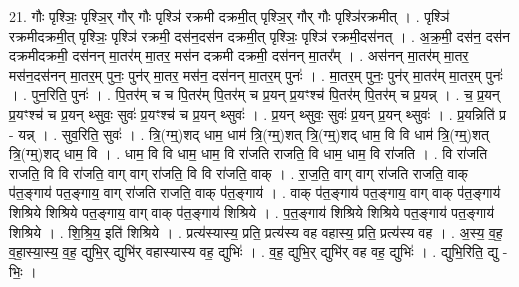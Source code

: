 \documentclass[17pt]{extarticle}
\begin{document}
21. गौः पृश्ञिः॒ पृश्ञि॒र् गौर् गौः पृश्ञि॑ रक्रमी दक्रमी॒त् पृश्ञि॒र् गौर् गौः पृश्ञि॑रक्रमीत् । . पृश्ञि॑ रक्रमीदक्रमी॒त् पृश्ञिः॒ पृश्ञि॑ रक्रमी॒ दस॑न॒दस॑न दक्रमी॒त् पृश्ञिः॒ पृश्ञि॑ रक्रमी॒दस॑नत् । . अ॒क्र॒मी॒ दस॑न॒ दस॑न दक्रमीदक्रमी॒ दस॑नन् मा॒तर॑म् मा॒तर॒ मस॑न दक्रमी दक्रमी॒ दस॑नन् मा॒तर᳚म् । . अस॑नन् मा॒तर॑म् मा॒तर॒ मस॑न॒दस॑नन् मा॒तर॒म् पुनः॒ पुन॑र् मा॒तर॒ मस॑न॒ दस॑नन् मा॒तर॒म् पुनः॑ । . मा॒तर॒म् पुनः॒ पुन॑र् मा॒तर॑म् मा॒तर॒म् पुनः॑ । . पुन॒रिति॒ पुनः॑ । . पि॒तर॑म् च च पि॒तर॑म् पि॒तर॑म् च प्र॒यन् प्र॒यꣳश्च॑ पि॒तर॑म् पि॒तर॑म् च प्र॒यन्न् । . च॒ प्र॒यन् प्र॒यꣳश्च॑ च प्र॒यन् थ्सुवः॒ सुवः॑ प्र॒यꣳश्च॑ च प्र॒यन् थ्सुवः॑ । . प्र॒यन् थ्सुवः॒ सुवः॑ प्र॒यन् प्र॒यन् थ्सुवः॑ । . प्र॒यन्निति॑ प्र - यन्न् । . सुव॒रिति॒ सुवः॑ । . त्रि॒(ग्म्॒)शद् धाम॒ धाम॑ त्रि॒(ग्म्॒)शत् त्रि॒(ग्म्॒)शद् धाम॒ वि वि धाम॑ त्रि॒(ग्म्॒)शत् त्रि॒(ग्म्॒)शद् धाम॒ वि । . धाम॒ वि वि धाम॒ धाम॒ वि रा॑जति राजति॒ वि धाम॒ धाम॒ वि रा॑जति । . वि रा॑जति राजति॒ वि वि रा॑जति॒ वाग् वाग् रा॑जति॒ वि वि रा॑जति॒ वाक् । . रा॒ज॒ति॒ वाग् वाग् रा॑जति राजति॒ वाक् प॑त॒ङ्गाय॑ पत॒ङ्गाय॒ वाग् रा॑जति राजति॒ वाक् प॑त॒ङ्गाय॑ । . वाक् प॑त॒ङ्गाय॑ पत॒ङ्गाय॒ वाग् वाक् प॑त॒ङ्गाय॑ शिश्रिये शिश्रिये पत॒ङ्गाय॒ वाग् वाक् प॑त॒ङ्गाय॑ शिश्रिये । . प॒त॒ङ्गाय॑ शिश्रिये शिश्रिये पत॒ङ्गाय॑ पत॒ङ्गाय॑ शिश्रिये । . शि॒श्रि॒य॒ इति॑ शिश्रिये । . प्रत्य॑स्यास्य॒ प्रति॒ प्रत्य॑स्य वह वहास्य॒ प्रति॒ प्रत्य॑स्य वह । . अ॒स्य॒ व॒ह॒ व॒हा॒स्या॒स्य॒ व॒ह॒ द्युभि॒र् द्युभि॑र् वहास्यास्य वह॒ द्युभिः॑ । . व॒ह॒ द्युभि॒र् द्युभि॑र् वह वह॒ द्युभिः॑ । . द्युभि॒रिति॒ द्यु - भिः॒ । \newline
\end{document}
